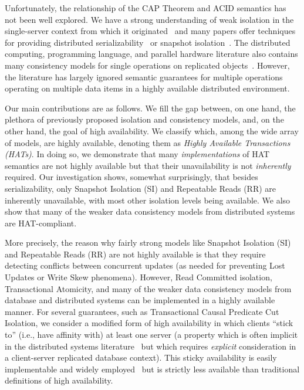 Unfortunately, the relationship of the CAP Theorem and ACID semantics
has not been well explored. We have a strong understanding of weak
isolation in the single-server context from which it
originated~\cite{adya, ansicritique, gray-isolation} and many papers
offer techniques for providing distributed
serializability~\cite{bernstein-book, spanner, daudjee-session,
  hstore, krikellas-bargain, calvin, kemme-classification} or snapshot
isolation~\cite{daudjee-snapshot,generalizedsnapshot, kemme-snapshot,
  walter}. The distributed computing, programming language, and
parallel hardware literature also contains many consistency models for
single operations on replicated objects~\cite{ ceri-mechanism,
  chen-mechanism, pnuts, herlihy-art, eiger, cac, sessionguarantees}. However, the literature has largely ignored semantic guarantees for
multiple operations operating on multiple data items in a highly
available distributed environment.

Our main contributions are as follows. We fill the gap between, on one
hand, the plethora of previously proposed isolation and consistency
models, and, on the other hand, the goal of high availability.  We
classify which, among the wide array of models, are highly available,
denoting them as {\em Highly Available Transactions (HATs)}. In doing
so, we demonstrate that many \textit{implementations} of HAT semantics
are not highly available but that their unavailability is not
\textit{inherently} required. Our investigation shows, somewhat
surprisingly, that besides serializability, only Snapshot Isolation
(SI) and Repeatable Reads (RR) are inherently unavailable, with most
other isolation levels being available. We also show that many of the
weaker data consistency models from distributed systems are
HAT-compliant.

More precisely, the reason why fairly strong models like Snapshot
Isolation (SI) and Repeatable Reads (RR) are not highly available is
that they require detecting conflicts between concurrent updates (as
needed for preventing Lost Updates or Write Skew phenomena). However,
Read Committed isolation, Transactional Atomicity, and many of the
weaker data consistency models from database and distributed systems
can be implemented in a highly available manner. For several
guarantees, such as Transactional Causal Predicate Cut Isolation, we
consider a modified form of high availability in which clients ``stick
to'' (i.e., have affinity with) at least one server (a property which
is often implicit in the distributed systems
literature~\cite{herlihy-art, eiger, cac} but which requires
\textit{explicit} consideration in a client-server replicated database
context). This sticky availability is easily implementable and widely
employed~\cite{eiger, vogels-defs} but is strictly less available than
traditional definitions of high availability.

